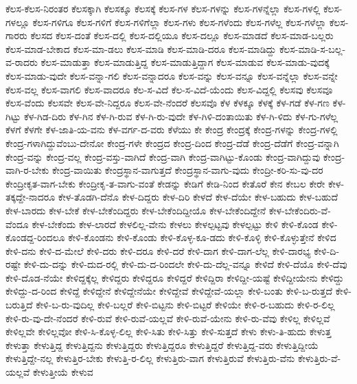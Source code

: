 {ಕೆಲಸ-ಕೆಲಸ-ನಿರಂತರ
ಕೆಲಸಕ್ಕಾಗಿ
ಕೆಲಸಕ್ಕೂ
ಕೆಲಸಕ್ಕೆ
ಕೆಲಸ-ಗಳ
ಕೆಲಸ-ಗಳನ್ನು
ಕೆಲಸ-ಗಳನ್ನೆಲ್ಲಾ
ಕೆಲಸ-ಗಳಲ್ಲಿ
ಕೆಲಸ-ಗಳಲ್ಲೂ
ಕೆಲಸ-ಗಳಿಗೂ
ಕೆಲಸ-ಗಳಿಗೆ
ಕೆಲಸ-ಗಳಿಗೆಲ್ಲಾ
ಕೆಲಸ-ಗಳು
ಕೆಲಸ-ಗಳೆಂದು
ಕೆಲಸ-ಗಳೆಲ್ಲ
ಕೆಲಸ-ಗಳೆಲ್ಲಾ
ಕೆಲಸ-ಗಾರರು
ಕೆಲಸದ
ಕೆಲಸ-ದಂತೆ
ಕೆಲಸ-ದಲ್ಲಿ
ಕೆಲಸ-ದಲ್ಲಿಯೂ
ಕೆಲಸ-ದಲ್ಲೂ
ಕೆಲಸ-ಮಾಡದೆ
ಕೆಲಸ-ಮಾಡ-ಬಲ್ಲರು
ಕೆಲಸ-ಮಾಡ-ಬೇಕಾದ
ಕೆಲಸ-ಮಾ-ಡಲು
ಕೆಲಸ-ಮಾಡಿ
ಕೆಲಸ-ಮಾಡಿ-ದರೂ
ಕೆಲಸ-ಮಾಡಿದ್ದು
ಕೆಲಸ-ಮಾಡಿ-ಸ-ಬಲ್ಲ-ವ-ರಾದರು
ಕೆಲಸ-ಮಾಡುತ್ತಾ
ಕೆಲಸ-ಮಾಡುತ್ತಿದ್ದ
ಕೆಲಸ-ಮಾಡುತ್ತಿದ್ದಾಗ
ಕೆಲಸ-ಮಾಡುವ
ಕೆಲಸ-ಮಾಡು-ವುದಕ್ಕೆ
ಕೆಲಸ-ಮಾಡು-ವುದೇ
ಕೆಲಸ-ವನ್ನಾ-ಗಲಿ
ಕೆಲಸ-ವನ್ನಾದರೂ
ಕೆಲಸ-ವನ್ನು
ಕೆಲಸ-ವನ್ನೂ
ಕೆಲಸ-ವನ್ನೆಲ್ಲಾ
ಕೆಲಸ-ವನ್ನೇ
ಕೆಲಸ-ವಲ್ಲ
ಕೆಲಸ-ವಾಗಲಿ
ಕೆಲಸ-ವಾದರೂ
ಕೆಲ-ಸ-ವಿದೆ
ಕೆಲ-ಸ-ವಿದೆ-ಯೆಂದು
ಕೆಲಸ-ವಿದ್ದಲ್ಲಿ
ಕೆಲಸವು
ಕೆಲಸವೂ
ಕೆಲಸ-ವೆಂದು
ಕೆಲಸವೇ
ಕೆಲಸ-ವೇ-ನಿದ್ದರೂ
ಕೆಲಸ-ವೇ-ನೆಂದರೆ
ಕೆಲಸವೊ
ಕೆಳ
ಕೆಳಕ್ಕೂ
ಕೆಳಕ್ಕೆ
ಕೆಳ-ಗಡೆ
ಕೆಳ-ಗಣ
ಕೆಳ-ಗಿಟ್ಟು
ಕೆಳ-ಗಿಡ-ದಿರು
ಕೆಳ-ಗಿನ
ಕೆಳ-ಗಿ-ರುವ
ಕೆಳ-ಗಿ-ರು-ವುದೇ
ಕೆಳ-ಗಿಳಿ-ದಂತಾಯಿತು
ಕೆಳ-ಗಿ-ಳಿದು
ಕೆಳ-ಗು-ಗಳೆಲ್ಲ
ಕೆಳಗೆ
ಕೆಳಗೇ
ಕೆಳ-ಜಾತಿ-ಯ-ವನು
ಕೆಳ-ವರ್ಗ-ದ-ವರು
ಕೆಳೆಯು
ಕೇ
ಕೇಂದ್ರ
ಕೇಂದ್ರಕ್ಕೆ
ಕೇಂದ್ರ-ಗಳನ್ನು
ಕೇಂದ್ರ-ಗಳಲ್ಲಿ
ಕೇಂದ್ರ-ಗಳಾಗಿದ್ದುವೆಂಬು-ದೇನೋ
ಕೇಂದ್ರ-ಗಳೇ
ಕೇಂದ್ರದ
ಕೇಂದ್ರ-ದಿಂದ
ಕೇಂದ್ರ-ದೆಡೆ
ಕೇಂದ್ರ-ದೆಡೆಗೆ
ಕೇಂದ್ರ-ವನ್ನಾಗಿ
ಕೇಂದ್ರ-ವನ್ನು
ಕೇಂದ್ರ-ವಲ್ಲ
ಕೇಂದ್ರ-ವಸ್ತು-ವಾಗಿದೆ
ಕೇಂದ್ರ-ವಾಗಿ
ಕೇಂದ್ರ-ವಾಗಿಟ್ಟು-ಕೊಂಡು
ಕೇಂದ್ರ-ವಾಗಿದ್ದುವು
ಕೇಂದ್ರ-ವಾಗಿ-ರ-ಬೇಕು
ಕೇಂದ್ರ-ವಾಯಿತು
ಕೇಂದ್ರಸ್ಥಾನ-ವಾಗುತ್ತದೆ
ಕೇಂದ್ರಸ್ಥಾನ-ವಾಗು-ವುದು
ಕೇಂದ್ರೀ-ಕರಿ-ಸು-ವು-ದರ
ಕೇಂದ್ರೀಕೃತ-ವಾಗ-ಬೇಕು
ಕೇಂದ್ರೀಕೃ-ತ-ವಾಗು-ವಂತೆ
ಕೇಡನ್ನು
ಕೇಡಿಗೆ
ಕೇಡಿ-ನಿಂದ
ಕೇತೊರೆ
ಕೇನ
ಕೇಬಲ
ಕೇರೇ
ಕೇಳ-ತಕ್ಕದ್ದೇ-ನಾದರೂ
ಕೇಳ-ತೊಡಗಿ-ದೆನೊ
ಕೇಳ-ದಿದ್ದರು
ಕೇಳ-ದಿರಿ
ಕೇಳದೆ
ಕೇಳ-ದೆಯೇ
ಕೇಳ-ಬಹುದು
ಕೇಳ-ಬಹುದೆ
ಕೇಳ-ಬಾರದು
ಕೇಳ-ಬೇಕೆ
ಕೇಳ-ಬೇಕೆಂದಿದ್ದರು
ಕೇಳ-ಬೇಕೆಂದಿದ್ದೀಯೊ
ಕೇಳ-ಬೇಕೆಂದಿದ್ದೇನೆ
ಕೇಳ-ಬೇಕೆಂದಿರು-ವೆ-ವೆಂದೂ
ಕೇಳ-ಬೇಕೆಂದು
ಕೇಳ-ಲಾರದೆ
ಕೇಳಲಿಲ್ಲ-ವೇನು
ಕೇಳಲು
ಕೇಳಲ್ಪಟ್ಟವು
ಕೇಳಲ್ಪಟ್ಟು
ಕೇಳಿ
ಕೇಳಿ-ಕೊಂಡ
ಕೇಳಿ-ಕೊಂಡದ್ದ-ರಿಂದಲೂ
ಕೇಳಿ-ಕೊಂಡನು
ಕೇಳಿ-ಕೊಂಡು
ಕೇಳಿ-ಕೊಳ್ಳ-ಕೂ-ಡದು
ಕೇಳಿ-ಕೊಳ್ಳಿ
ಕೇಳಿ-ಕೊಳ್ಳುತ್ತೇನೆ
ಕೇಳಿದ
ಕೇಳಿ-ದನು
ಕೇಳಿ-ದ-ಮೇಲೆ
ಕೇಳಿ-ದರು
ಕೇಳಿ-ದರೂ
ಕೇಳಿ-ದರೆ
ಕೇಳಿ-ದಾಗ
ಕೇಳಿ-ದಾಗ-ಲೆಲ್ಲ
ಕೇಳಿ-ದಾರಭ್ಯ
ಕೇಳಿ-ದಿ-ರಷ್ಟೇ
ಕೇಳಿ-ದು-ದನ್ನು
ಕೇಳಿ-ದುದ-ರಲ್ಲಿ
ಕೇಳಿ-ದು-ದ-ರಿಂದಲೇ
ಕೇಳಿ-ದು-ದೆಲ್ಲ-ವನ್ನೂ
ಕೇಳಿದೆ
ಕೇಳಿ-ದೆಯೊ
ಕೇಳಿ-ದೆವು
ಕೇಳಿ-ದೊಡ-ನೆಯೇ
ಕೇಳಿದ್ದಕ್ಕೆಲ್ಲ
ಕೇಳಿದ್ದರು
ಕೇಳಿದ್ದರೂ
ಕೇಳಿದ್ದರೆ
ಕೇಳಿದ್ದಿರಾ
ಕೇಳಿದ್ದೀ-ಯಷ್ಟೆ
ಕೇಳಿದ್ದೀಯೇನು
ಕೇಳಿದ್ದು
ಕೇಳಿದ್ದು-ದ-ರಿಂದ
ಕೇಳಿದ್ದೆ
ಕೇಳಿದ್ದೇನೆ
ಕೇಳಿದ್ದೇನೆಯೇ
ಕೇಳಿದ್ದೇವೆ
ಕೇಳಿದ್ದೇವೆ-ಯಲ್ಲಾ
ಕೇಳಿ-ಬಂತು
ಕೇಳಿ-ಬ-ರುತ್ತದೆ
ಕೇಳಿ-ಬರುತ್ತಿದೆ
ಕೇಳಿ-ಬ-ರು-ವುದಿಲ್ಲ
ಕೇಳಿ-ಬಲ್ಲರೆ
ಕೇಳಿ-ಬಿಟ್ಟನು
ಕೇಳಿ-ಬಿಟ್ಟರೆ
ಕೇಳಿಯೇ
ಕೇಳಿ-ರ-ಬಹುದು
ಕೇಳಿ-ರ-ಲಿಲ್ಲ
ಕೇಳಿ-ರು-ವು-ದೇ-ನೆಂದರೆ
ಕೇಳಿ-ರುವೆ
ಕೇಳಿ-ರುವೆ-ಯಲ್ಲವೆ
ಕೇಳಿ-ರುವೆ-ಯೇನು
ಕೇಳಿ-ರು-ವೆವು
ಕೇಳಿಲ್ಲ
ಕೇಳಿಲ್ಲವೆ
ಕೇಳಿಲ್ಲವೇ
ಕೇಳಿಲ್ಲವೋ
ಕೇಳಿ-ಸಿ-ಕೊಳ್ಳ-ಲಿಲ್ಲ
ಕೇಳಿ-ಸಿತು
ಕೇಳಿ-ಸಿತ್ತು
ಕೇಳಿ-ಸುತ್ತದೆ
ಕೇಳು
ಕೇಳು-ತಿ-ಹುದು
ಕೇಳುತ್ತ
ಕೇಳುತ್ತಾ
ಕೇಳುತ್ತಿದ್ದ
ಕೇಳುತ್ತಿದ್ದನು
ಕೇಳುತ್ತಿದ್ದರು
ಕೇಳುತ್ತಿದ್ದರೂ
ಕೇಳುತ್ತಿದ್ದರೆ
ಕೇಳುತ್ತಿದ್ದ-ವರು
ಕೇಳುತ್ತಿದ್ದೀಯೆ
ಕೇಳುತ್ತಿದ್ದೇ-ನಲ್ಲ
ಕೇಳುತ್ತಿರ-ಬೇಕು
ಕೇಳುತ್ತಿ-ರ-ಲಿಲ್ಲ
ಕೇಳುತ್ತಿರು-ವಾಗ
ಕೇಳುತ್ತಿರುವೆ
ಕೇಳುತ್ತಿರು-ವೆನು
ಕೇಳುತ್ತಿರು-ವೆ-ಯಲ್ಲವೆ
ಕೇಳುತ್ತೀಯೆ
ಕೇಳುವ
}

